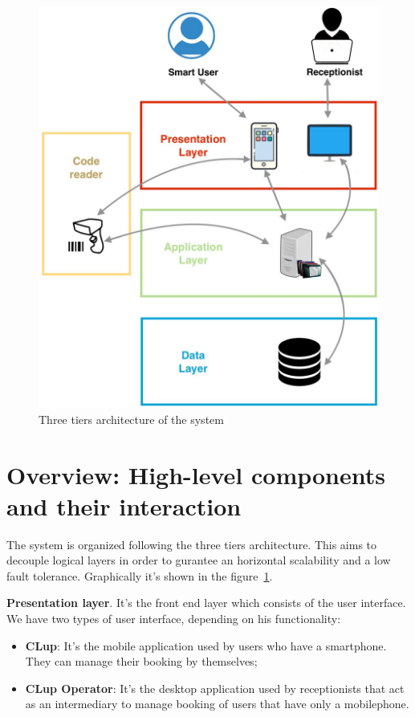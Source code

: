 \begin{figure}[H]
  \caption{Three tiers architecture of the system}
  \label{3tiers}
  \centering
  \includegraphics[scale=0.25]{diagrams/3_tiers.jpeg}

\end{figure}


\section{Overview: High-level components and their interaction}
The system is organized following the three tiers architecture. This aims to decouple logical layers in order to gurantee an horizontal scalability and a low fault tolerance.
Graphically it's shown in the figure~\ref{3tiers}.
\par


\textbf{Presentation layer}. It's the front end layer which consists of the user interface. We have two types of user interface, depending on his functionality: 
\begin{itemize}
\item \textbf{CLup}: It's the mobile application used by users who have a smartphone. They can manage their booking by themselves;
\item \textbf{CLup Operator}: It's the desktop application used by receptionists that act as an intermediary to manage booking of users that have only a mobilephone.
\end{itemize}

